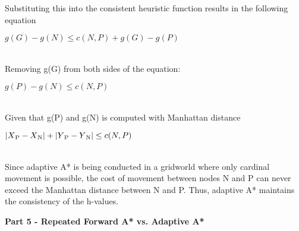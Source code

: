 \documentclass[11pt]{article}
\begin{document}
    Substituting this into the consistent heuristic function results in the following equation\\
    \centerline{$g(G) - g(N) \le c(N,P) + g(G) - g(P)$}\\
    
    Removing g(G) from both sides of the equation:\\
    \centerline{$g(P) - g(N) \le c(N,P)$}\\
    
    Given that g(P) and g(N) is computed with Manhattan distance\\
    \centerline{$|X\textsubscript{P}-X\textsubscript{N}| + |Y\textsubscript{P}-Y\textsubscript{N}| \le c(N, P)$}\\
    
    Since adaptive A* is being conducted in a gridworld where only cardinal movement is possible, the cost of movement between nodes N and P can never exceed the Manhattan distance between N and P. Thus, adaptive A* maintains the consistency of the h-values.
    
    \begin{center}
        \Large
        \textbf{Part 5 - Repeated Forward A* vs. Adaptive A*}
    \end{center}
    
\end{document}
